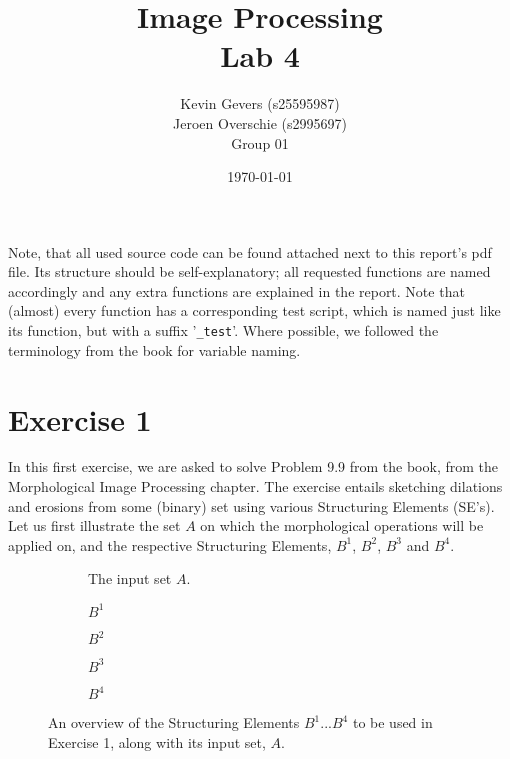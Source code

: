 \documentclass{article}
\title{Image Processing\\
    Lab 4}
\author{Kevin Gevers (s25595987) \\ Jeroen Overschie (s2995697)\\Group 01}
\date{\today}
\begin{document}
\maketitle

Note, that all used source code can be found attached next to this report's pdf file. Its structure should be self-explanatory; all requested functions are named accordingly and any extra functions are explained in the report. Note that (almost) every function has a corresponding test script, which is named just like its function, but with a suffix '\texttt{\_test}'. Where possible, we followed the terminology from the book \citep{gonzalez2008digital} for variable naming.

\section*{Exercise 1}
In this first exercise, we are asked to solve Problem 9.9 from the book, from the Morphological Image Processing chapter. The exercise entails sketching dilations and erosions from some (binary) set using various Structuring Elements (SE's). Let us first illustrate the set $A$ on which the morphological operations will be applied on, and the respective Structuring Elements, $B^1$, $B^2$, $B^3$ and $B^4$.

\begin{figure}[H]
     \centering
     \begin{subfigure}[b]{0.3\textwidth}
         \centering
         
         \caption{The input set $A$.}
         \label{fig:set_A}
     \end{subfigure}
     \hfill
     \begin{subfigure}[b]{0.08\textwidth}
         \centering
         
         \caption{$B^1$}
         \label{fig:SE_B1}
     \end{subfigure}
     \hfill
     \begin{subfigure}[b]{0.15\textwidth}
         \centering
         
         \caption{$B^2$}
         \label{fig:SE_B2}
     \end{subfigure}
     \hfill
     \begin{subfigure}[b]{0.11\textwidth}
         \centering
         
         \caption{$B^3$}
         \label{fig:SE_B3}
     \end{subfigure}
     \hfill
     \begin{subfigure}[b]{0.18\textwidth}
         \centering
         
         \caption{$B^4$}
         \label{fig:SE_B4}
     \end{subfigure}
     
    \caption{An overview of the Structuring Elements $B^1 ... B^4$ to be used in Exercise 1, along with its input set, $A$.}
    \label{fig:ex1_overview}
\end{figure}
\end{document}
